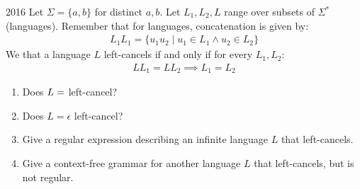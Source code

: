 
\begin{exercise}{2016}
  Let \(\Sigma = \{a, b\}\) for distinct \(a, b\). Let \(L_1, L_2, L\) range
  over subsets of \(\Sigma^*\) (languages). Remember that for languages,
  concatenation is given by:
  \begin{gather*}
    L_1L_1 = \{u_1u_2 \mid u_1 \in L_1 \land u_2 \in L_2\}
  \end{gather*}
  We that a language \(L\) left-cancels if and only if for every \(L_1, L_2\):
  \begin{gather*}
    LL_1 = LL_2 \implies L_1 = L_2
  \end{gather*}

  \begin{enumerate}
    \item Does \(L = \empty\) left-cancel? 
    \item Does \(L = \epsilon\) left-cancel? 
    \item Give a regular expression describing an infinite language \(L\) that left-cancels. 
    \item Give a context-free grammar for another language \(L\) that
    left-cancels, but is not regular. 
  \end{enumerate}
\end{exercise}
